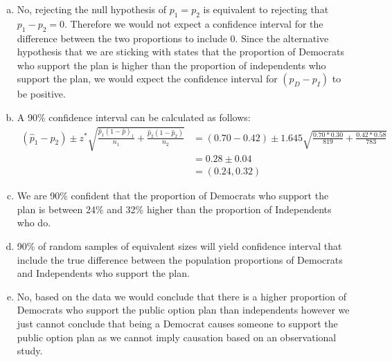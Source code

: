 {\begin{enumerate}[(a)]
\item No, rejecting the null hypothesis of $p_1 = p_2$ is equivalent to rejecting that $p_1 - p_2 = 0$. Therefore we would not expect a confidence interval for the difference between the two proportions to include 0. Since the alternative hypothesis that we are sticking with states that the proportion of Democrats who support the plan is higher than the proportion of independents who support the plan, we would expect the confidence interval for $(p_{D} - p_{I})$ to be positive.

\item A 90\% confidence interval can be calculated as follows:
\begin{align*}
(\hat{p}_1 - \hat{p}_2) \pm z^* \sqrt{ \frac{\hat{p}_1 (1 - \hat{p})_1}{n_1} + \frac{\hat{p}_2 (1 - \hat{p}_2)}{n_2} } &= (0.70 - 0.42) \pm 1.645 \sqrt{ \frac{0.70 * 0.30}{819} + \frac{0.42 * 0.58}{783} } \\
&= 0.28 \pm 0.04 \\
&= (0.24, 0.32)
\end{align*}

\item We are 90\% confident that the proportion of Democrats who support the plan is between 24\% and 32\% higher than the proportion of Independents who do.

\item 90\% of random samples of equivalent sizes will yield confidence interval that include the true difference between the population proportions of Democrats and Independents who support the plan.

\item No, based on the data we would conclude that there is a higher proportion of Democrats who support the public option plan than independents however we just cannot conclude that being a Democrat causes someone to support the public option plan as we cannot imply causation based on an observational study.
\end{enumerate}
}

%

